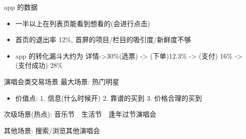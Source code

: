 \documentclass[presentation, bigger]{beamer}
\begin{document}
\begin{frame}[label={sec:orgbe5dc14}]{app 的数据}
\begin{itemize}
\item 一半以上在列表页能看到想看的(会进行点击)
\item 首页的退出率 12\%, 首屏的项目/栏目的吸引度/新鲜度不够
\item app 的转化漏斗大约为 详情->30\%(选票) -> (下单)12.3\% -> (支付) 16\% -> (支付成功) 28\%
\end{itemize}
\end{frame}

\begin{frame}[label={sec:org2454e21}]{演唱会类交易场景}
最大场景: 热门明星
\begin{itemize}
\item 价值点: 1. 信息(什么时候开)  2. 靠谱的买到 3. 价格合理的买到
\end{itemize}

次级场景(热点): 音乐节　生活节　逢年过节演唱会

其他场景: 搜索/浏览其他演唱会
\end{frame}
\end{document}
